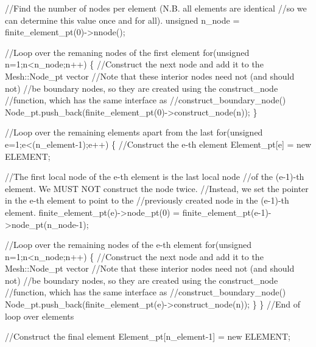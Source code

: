 \begin{DoxyCodeInclude}
  \textcolor{comment}{//Find the number of nodes per element (N.B. all elements are identical}
  \textcolor{comment}{//so we can determine this value once and for all). }
  \textcolor{keywordtype}{unsigned} n\_node = finite\_element\_pt(0)->nnode();

  \textcolor{comment}{//Loop over the remaning nodes of the first element}
  \textcolor{keywordflow}{for}(\textcolor{keywordtype}{unsigned} n=1;n<n\_node;n++)
   \{
    \textcolor{comment}{//Construct the next node and add it to the Mesh::Node\_pt vector}
    \textcolor{comment}{//Note that these interior nodes need not (and should not)}
    \textcolor{comment}{//be boundary nodes, so they are created using the construct\_node}
    \textcolor{comment}{//function, which has the same interface as}
    \textcolor{comment}{//construct\_boundary\_node()}
    Node\_pt.push\_back(finite\_element\_pt(0)->construct\_node(n));
   \}

  \textcolor{comment}{//Loop over the remaining elements apart from the last}
  \textcolor{keywordflow}{for}(\textcolor{keywordtype}{unsigned} e=1;e<(n\_element-1);e++)
   \{
    \textcolor{comment}{//Construct the e-th element}
    Element\_pt[e] = \textcolor{keyword}{new} ELEMENT;

    \textcolor{comment}{//The first local node of the e-th element is the last local node}
    \textcolor{comment}{//of the (e-1)-th element. We MUST NOT construct the node twice.}
    \textcolor{comment}{//Instead, we set the pointer in the e-th element to point to the}
    \textcolor{comment}{//previously created node in the (e-1)-th element.}
    finite\_element\_pt(e)->node\_pt(0) = 
      finite\_element\_pt(e-1)->node\_pt(n\_node-1);

    \textcolor{comment}{//Loop over the remaining nodes of the e-th element}
    \textcolor{keywordflow}{for}(\textcolor{keywordtype}{unsigned} n=1;n<n\_node;n++)
     \{
      \textcolor{comment}{//Construct the next node and add it to the Mesh::Node\_pt vector}
      \textcolor{comment}{//Note that these interior nodes need not (and should not)}
      \textcolor{comment}{//be boundary nodes, so they are created using the construct\_node}
      \textcolor{comment}{//function, which has the same interface as}
      \textcolor{comment}{//construct\_boundary\_node()}
      Node\_pt.push\_back(finite\_element\_pt(e)->construct\_node(n));
     \}
   \} \textcolor{comment}{//End of loop over elements}
  
  
  \textcolor{comment}{//Construct the final element}
  Element\_pt[n\_element-1] = \textcolor{keyword}{new} ELEMENT;
  

\end{DoxyCodeInclude}
